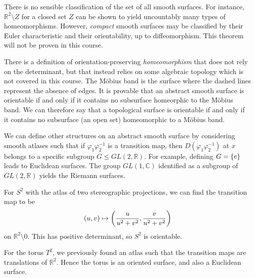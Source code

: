 \begin{remark}
	There is no sensible classification of the set of all smooth surfaces.
	For instance, \( \mathbb R^2 \setminus Z \) for a closed set \( Z \) can be shown to yield uncountably many types of homeomorphisms.
	However, \textit{compact} smooth surfaces may be classified by their Euler characteristic and their orientability, up to diffeomorphism.
	This theorem will not be proven in this course.

	There is a definition of orientation-preserving \textit{homeomorphism} that does not rely on the determinant, but that instead relies on some algebraic topology which is not covered in this course.
	The M\"obius band is the surface
	where the dashed lines represent the absence of edges.
	It is provable that an abstract smooth surface is orientable if and only if it contains no subsurface homeorphic to the M\"obius band.
	We can therefore say that a topological surface is orientable if and only if it contains no subsurface (an open set) homeomorphic to a M\"obius band.

	We can define other structures on an abstract smooth surface by considering smooth atlases such that if \( \varphi_1 \varphi_2^{-1} \) is a transition map, then \( D (\varphi_1 \varphi_2^{-1}) \) at \( x \) belongs to a specific subgroup \( G \leq GL(2, \mathbb R) \).
	For example, defining \( G = \qty{e} \) leads to Euclidean surfaces.
	The group \( GL(1, \mathbb C) \) identified as a subgroup of \( GL(2, \mathbb R) \) yields the Riemann surfaces.
\end{remark}
\begin{example}
	For \( S^2 \) with the atlas of two stereographic projections, we can find the transition map to be
	\[ (u,v) \mapsto \qty(\frac{u}{u^2 + v^2}, \frac{v}{u^2 + v^2}) \]
	on \( \mathbb R^2 \setminus \qty{0} \).
	This has positive determinant, so \( S^2 \) is orientable.

	For the torus \( T^2 \), we previously found an atlas such that the transition maps are translations of \( \mathbb R^2 \).
	Hence the torus is an oriented surface, and also a Euclidean surface.
\end{example}

